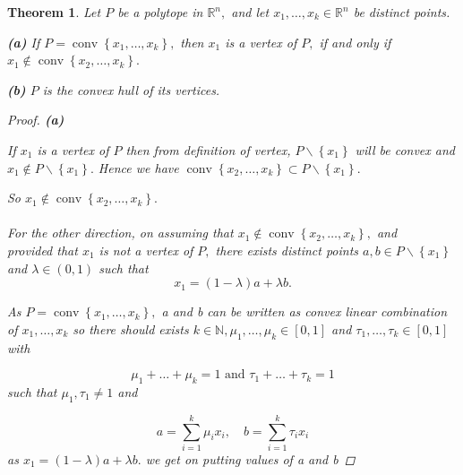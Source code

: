 \documentclass[oneside]{book}
\newtheorem{theorem}{Theorem}[section]
\begin{document}
	
	
	
	
	
	
	
	
	
	
	\begin{theorem}
		\label{t:6}
		Let $P$ be a polytope in $\mathbb{R}^{n},$ and let $x_{1}, \ldots, x_{k} \in \mathbb{R}^{n}$ be distinct points.\par
		\textbf{(a)} If $P=\operatorname{conv}\left\{x_{1}, \ldots, x_{k}\right\},$ then $x_{1}$ is a vertex of $P,$ if and only if $x_{1} \notin \operatorname{conv}\left\{x_{2}, \ldots, x_{k}\right\}.$ \par
		\textbf{(b)} $P$ is the convex hull of its vertices.
		\\
		
		\begin{proof}
			
			\textbf{(a)}  \par 
			
			
			If  $x_{1}$ is a vertex of $P $ then  from definition of vertex, $P \backslash\left\{x_{1}\right\}$ will be convex and $x_{1} \notin P \backslash\left\{x_{1}\right\} .$ Hence we have  $\operatorname{conv}\left\{x_{2}, \ldots, x_{k}\right\} \subset P \backslash\left\{x_{1}\right\}.$ 
			\par 
			So  $x_{1} \notin \operatorname{conv}\left\{x_{2}, \ldots, x_{k}\right\}.$ 
			\\\\
			For the other direction, on assuming that $x_{1} \notin \operatorname{conv}\left\{x_{2}, \ldots, x_{k}\right\}, $ and \\
			provided that  $x_{1}$ is not a vertex of $P,$ there exists distinct points $a, b \in P \backslash\left\{x_{1}\right\}$ and $\lambda \in(0,1)$ such that
			$$x_{1}=(1-\lambda) a+\lambda b .$$ 
			
			As  $P=\operatorname{conv}\left\{x_{1}, \ldots, x_{k}\right\},$ a and b can be written as convex linear combination of $x_{1},\ldots ,x_{k} $   so there should exists $k \in \mathbb{N}, \mu_{1}, \ldots, \mu_{k} \in[0,1]$ and $\tau_{1}, \ldots, \tau_{k} \in[0,1]$ with
			
			$$\mu_{1}+\ldots+\mu_{k}=1 \text{ and } \tau_{1}+\ldots+\tau_{k}=1 $$
			such that $\mu_{1}, \tau_{1} \neq 1$ and \par
			\begin{equation}
			\label{eq37}
			a=\sum_{i=1}^{k} \mu_{i} x_{i}, \quad b=\sum_{i=1}^{k} \tau_{i} x_{i}
			\end{equation}  
			as $x_{1}=(1-\lambda) a+\lambda b .$ we get on putting values of a and b 
			

\end{proof}
\end{theorem}
\end{document}
